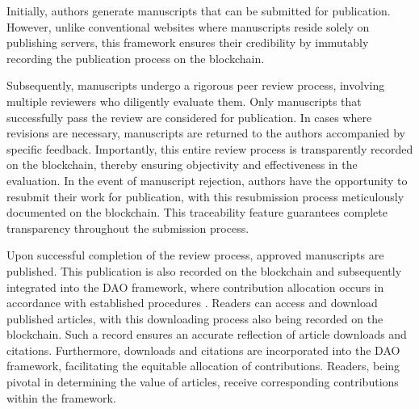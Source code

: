 \documentclass[lettersize,journal]{IEEEtran}
\begin{document}
Initially, authors generate manuscripts that can be submitted for publication. However, unlike conventional websites where manuscripts reside solely on publishing servers, this framework ensures their credibility by immutably recording the publication process on the blockchain. 

Subsequently, manuscripts undergo a rigorous peer review process, involving multiple reviewers who diligently evaluate them. Only manuscripts that successfully pass the review are considered for publication. In cases where revisions are necessary, manuscripts are returned to the authors accompanied by specific feedback. Importantly, this entire review process is transparently recorded on the blockchain, thereby ensuring objectivity and effectiveness in the evaluation. 
In the event of manuscript rejection, authors have the opportunity to resubmit their work for publication, with this resubmission process meticulously documented on the blockchain. This traceability feature guarantees complete transparency throughout the submission process. 

Upon successful completion of the review process, approved manuscripts are published. This publication is also recorded on the blockchain and subsequently integrated into the DAO framework, where contribution allocation occurs in accordance with established procedures \cite{hsieh2018bitcoin}. 
Readers can access and download published articles, with this downloading process also being recorded on the blockchain. Such a record ensures an accurate reflection of article downloads and citations. Furthermore, downloads and citations are incorporated into the DAO framework, facilitating the equitable allocation of contributions. Readers, being pivotal in determining the value of articles, receive corresponding contributions within the framework.
\end{document}
